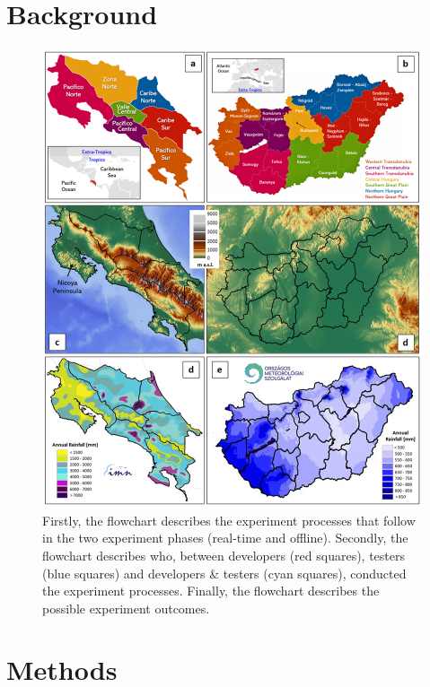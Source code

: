 \documentclass[twocol]{ametsocV5} %
\begin{document}
\section{Background}
\begin{figure}
\centerline{\includegraphics[width=39pc]{manuscript/Figures/Background_Location_Orography_AnnualRainfall_H_CR.png}}
\caption{Firstly, the flowchart describes the experiment processes that follow in the two experiment phases (real-time and offline). Secondly, the flowchart describes who, between developers (red squares), testers (blue squares) and developers & testers (cyan squares), conducted the experiment processes. Finally, the flowchart describes the possible experiment outcomes.}
\label{Location_Annual_Rainfall_H_CR}
\end{figure}


\section{Methods} 
\end{document}
